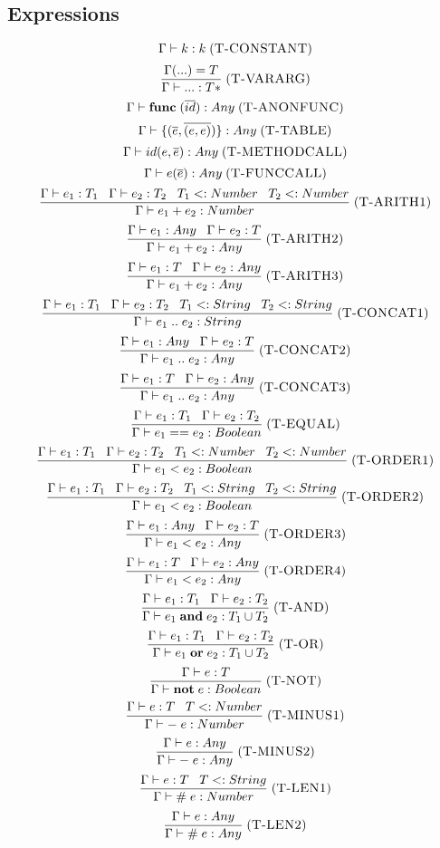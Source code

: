 \documentclass[12pt]{article}
\newcommand{\mylabel}[1]{\; (\textsc{#1})}
\newcommand{\subtype}{<:}
\newcommand{\env}{\Gamma}
\begin{document}
\subsection{Expressions}

\[
\env \vdash k : k
\mylabel{T-CONSTANT}
\]
\[
\frac{\env({...}) = T}
     {\env \vdash {...} : T*}
\mylabel{T-VARARG}
\]
\[
\env \vdash \mathbf{func} \; (\overline{id}) : Any
\mylabel{T-ANONFUNC}
\]
\[
\env \vdash \{(\overline{e},\overline{(e,e)})\} : Any
\mylabel{T-TABLE}
\]
\[
\env \vdash id(e,\overline{e}) : Any
\mylabel{T-METHODCALL}
\]
\[
\env \vdash e(\overline{e}) : Any
\mylabel{T-FUNCCALL}
\]
\[
\frac{\env \vdash e_{1}:T_{1} \;\;\; \env \vdash e_{2}:T_{2} \;\;\;
      T_{1} \subtype Number \;\;\; T_{2} \subtype Number}
     {\env \vdash e_{1} + e_{2} : Number}
\mylabel{T-ARITH1}
\]
\[
\frac{\env \vdash e_{1}:Any \;\;\; \env \vdash e_{2}:T}
     {\env \vdash e_{1} + e_{2} : Any}
\mylabel{T-ARITH2}
\]
\[
\frac{\env \vdash e_{1}:T \;\;\; \env \vdash e_{2}:Any}
     {\env \vdash e_{1} + e_{2} : Any}
\mylabel{T-ARITH3}
\]
\[
\frac{\env \vdash e_{1}:T_{1} \;\;\; \env \vdash e_{2}:T_{2} \;\;\;
      T_{1} \subtype String \;\;\; T_{2} \subtype String}
     {\env \vdash e_{1} \; {..} \;  e_{2} : String}
\mylabel{T-CONCAT1}
\]
\[
\frac{\env \vdash e_{1}:Any \;\;\; \env \vdash e_{2}:T}
     {\env \vdash e_{1} \; {..} \; e_{2} : Any}
\mylabel{T-CONCAT2}
\]
\[
\frac{\env \vdash e_{1}:T \;\;\; \env \vdash e_{2}:Any}
     {\env \vdash e_{1} \; {..} \; e_{2} : Any}
\mylabel{T-CONCAT3}
\]
\[
\frac{\env \vdash e_{1}:T_{1} \;\;\; \env \vdash e_{2}:T_{2}}
     {\env \vdash e_{1} == e_{2} : Boolean}
\mylabel{T-EQUAL}
\]
\[
\frac{\env \vdash e_{1}:T_{1} \;\;\; \env \vdash e_{2}:T_{2} \;\;\;
      T_{1} \subtype Number \;\;\; T_{2} \subtype Number}
     {\env \vdash e_{1} < e_{2} : Boolean}
\mylabel{T-ORDER1}
\]
\[
\frac{\env \vdash e_{1}:T_{1} \;\;\; \env \vdash e_{2}:T_{2} \;\;\;
      T_{1} \subtype String \;\;\; T_{2} \subtype String}
     {\env \vdash e_{1} < e_{2} : Boolean}
\mylabel{T-ORDER2}
\]
\[
\frac{\env \vdash e_{1}:Any \;\;\; \env \vdash e_{2}:T}
     {\env \vdash e_{1} < e_{2} : Any}
\mylabel{T-ORDER3}
\]
\[
\frac{\env \vdash e_{1}:T \;\;\; \env \vdash e_{2}:Any}
     {\env \vdash e_{1} < e_{2} : Any}
\mylabel{T-ORDER4}
\]
\[
\frac{\env \vdash e_{1}:T_{1} \;\;\; \env \vdash e_{2}:T_{2}}
     {\env \vdash e_{1} \; \mathbf{and} \; e_{2} : T_{1} \cup T_{2}}
\mylabel{T-AND}
\]
\[
\frac{\env \vdash e_{1}:T_{1} \;\;\; \env \vdash e_{2}:T_{2}}
     {\env \vdash e_{1} \; \mathbf{or} \; e_{2} : T_{1} \cup T_{2}}
\mylabel{T-OR}
\]
\[
\frac{\env \vdash e:T}
     {\env \vdash \mathbf{not} \; e : Boolean}
\mylabel{T-NOT}
\]
\[
\frac{\env \vdash e:T \;\;\; T \subtype Number}
     {\env \vdash - \; e : Number}
\mylabel{T-MINUS1}
\]
\[
\frac{\env \vdash e:Any}
     {\env \vdash - \; e : Any}
\mylabel{T-MINUS2}
\]
\[
\frac{\env \vdash e:T \;\;\; T \subtype String}
     {\env \vdash \# \; e : Number}
\mylabel{T-LEN1}
\]
\[
\frac{\env \vdash e:Any}
     {\env \vdash \# \; e : Any}
\mylabel{T-LEN2}
\]
\end{document}
